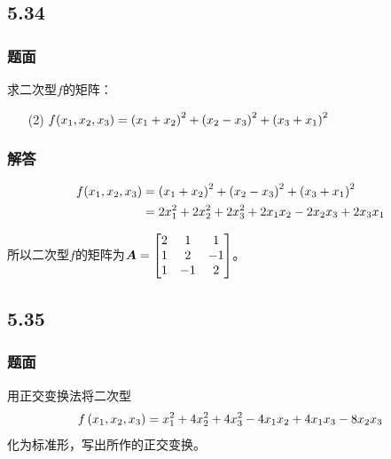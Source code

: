 \documentclass{beamer}
\begin{document}
\subsection*{5.34}
\begin{frame}
    \frametitle{题面}
    求二次型\(f\)的矩阵：
    \begin{enumerate}
        \item[(2)] \(f(x_1,x_2,x_3)=\left( x_1+x_2 \right)^2+\left( x_2-x_3 \right)^2+\left( x_3+x_1 \right)^2\)
    \end{enumerate}
\end{frame}

\begin{frame}
    \frametitle{解答}
    \begin{align*}
        f(x_1,x_2,x_3) & =\left( x_1+x_2 \right)^2+\left( x_2-x_3 \right)^2+\left( x_3+x_1 \right)^2 \\
                       & =2x_1^2+2x_2^2+2x_3^2+2x_1x_2-2x_2x_3+2x_3x_1
    \end{align*}

    所以二次型\(f\)的矩阵为\(\boldsymbol{A}=\begin{bmatrix}2&1&1\\1&2&-1\\1&-1&2\end{bmatrix}\)。
\end{frame}

\subsection*{5.35}
\begin{frame}
    \frametitle{题面}
    用正交变换法将二次型
    \begin{equation*}
        f\left( x_1,x_2,x_3 \right)=x_1^2+4x_2^2+4x_3^2-4x_1x_2+4x_1x_3-8x_2x_3
    \end{equation*}
    化为标准形，写出所作的正交变换。
\end{frame}
\end{document}
